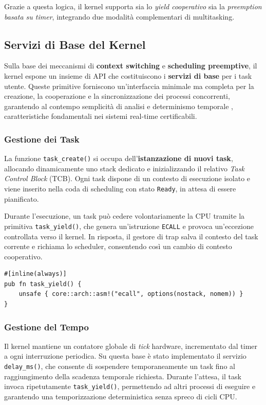 \documentclass[italian, Lau, oneside]{sapthesis} %
\begin{document}
Grazie a questa logica, il kernel supporta sia lo \emph{yield cooperativo} sia la \emph{preemption basata su timer}, integrando due modalità complementari di multitasking.

\subsection{Servizi di Base del Kernel}

Sulla base dei meccanismi di \textbf{context switching} e \textbf{scheduling preemptive}, il kernel espone un insieme di API che costituiscono i \textbf{servizi di base} per i task utente.  
Queste primitive forniscono un’interfaccia minimale ma completa per la creazione, la cooperazione e la sincronizzazione dei processi concorrenti, garantendo al contempo semplicità di analisi e determinismo temporale , caratteristiche fondamentali nei sistemi real-time certificabili.

\subsubsection*{Gestione dei Task}

La funzione \texttt{task\_create()} si occupa dell’\textbf{istanza­zione di nuovi task}, allocando dinamicamente uno stack dedicato e inizializzando il relativo \emph{Task Control Block} (TCB).  
Ogni task dispone di un contesto di esecuzione isolato e viene inserito nella coda di scheduling con stato \texttt{Ready}, in attesa di essere pianificato.

Durante l’esecuzione, un task può cedere volontariamente la CPU tramite la primitiva \texttt{task\_yield()}, che genera un’istruzione \texttt{ECALL} e provoca un’eccezione controllata verso il kernel.  
In risposta, il gestore di trap salva il contesto del task corrente e richiama lo scheduler, consentendo così un cambio di contesto cooperativo.

\begin{center}
\begin{verbatim}
#[inline(always)]
pub fn task_yield() {
    unsafe { core::arch::asm!("ecall", options(nostack, nomem)) }
}
\end{verbatim}
\end{center}

\subsubsection*{Gestione del Tempo}

Il kernel mantiene un contatore globale di \emph{tick} hardware, incrementato dal timer a ogni interruzione periodica.  
Su questa base è stato implementato il servizio \texttt{delay\_ms()}, che consente di sospendere temporaneamente un task fino al raggiungimento della scadenza temporale richiesta.  
Durante l’attesa, il task invoca ripetutamente \texttt{task\_yield()}, permettendo ad altri processi di eseguire e garantendo una temporizzazione deterministica senza spreco di cicli CPU.
\end{document}
